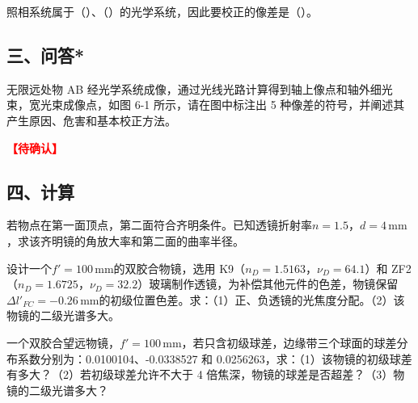 \documentclass[standard, analysis, notocnum]{ExBook}
\newcommand{\answerarea}[1][8cm]{%
  \par\vspace{2mm}%
  \noindent{\color{themeColor!35}\rule{\linewidth}{0.4pt}}\par
  \noindent\begin{minipage}[t][#1][t]{\linewidth}\vspace{0pt}\end{minipage}\par
  \noindent{\color{themeColor!35}\rule{\linewidth}{0.4pt}}\par
}
\newcommand{\tbd}{\textcolor{red}{\textbf{【待确认】}}}
\begin{document}
\begin{qitems}
\begin{bbox}
\answerarea[3.5cm]
\end{bbox}
\begin{bbox}
\qitem 照相系统属于（\hspace{1.6em}）、（\hspace{1.6em}）的光学系统，因此要校正的像差是（\hspace{1.6em}）。
\answerarea[3.5cm]
\end{bbox}
\end{qitems}

\subsection{三、问答*}
\begin{qitems}[unshow,suffix={}]
\qitem 无限远处物 AB 经光学系统成像，通过光线光路计算得到轴上像点和轴外细光束，宽光束成像点，如图 6-1 所示，请在图中标注出 5 种像差的符号，并阐述其产生原因、危害和基本校正方法。
\par\noindent\tbd
{}
\label{q:112:start}
\answerarea[8cm]
\label{q:112:end}
\end{qitems}

\subsection{四、计算}
\begin{qitems}[startnum=1]
\qitem 若物点在第一面顶点，第二面符合齐明条件。已知透镜折射率$n=1.5$，$d=4\,\mathrm{mm}$，求该齐明镜的角放大率和第二面的曲率半径。
\label{q:114:start}
\answerarea[8cm]
\label{q:114:end}
\end{qitems}

\begin{qitems}[startnum=2]
\qitem 设计一个$f'=100\,\mathrm{mm}$的双胶合物镜，选用 K9（$n_{D}=1.5163$，$\nu_{D}=64.1$）和 ZF2（$n_{D}=1.6725$，$\nu_{D}=32.2$）玻璃制作透镜，为补偿其他元件的色差，物镜保留$\Delta l'_{FC}=-0.26\,\mathrm{mm}$的初级位置色差。求：（1）正、负透镜的光焦度分配。（2）该物镜的二级光谱多大。
\label{q:115:start}
\answerarea[8cm]
\label{q:115:end}
\end{qitems}

\begin{qitems}[startnum=3]
\qitem 一个双胶合望远物镜，$f'=100\,\mathrm{mm}$，若只含初级球差，边缘带三个球面的球差分布系数分别为：0.0100104、-0.0338527 和 0.0256263，求：（1）该物镜的初级球差有多大？（2）若初级球差允许不大于 4 倍焦深，物镜的球差是否超差？（3）物镜的二级光谱多大？
\label{q:116:start}
\answerarea[8cm]
\label{q:116:end}
\end{qitems}
\end{document}
